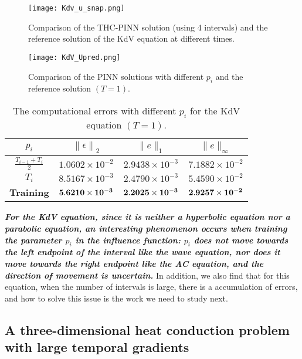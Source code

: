 \documentclass[preprint]{elsarticle}
\numberwithin{table}{section}
\numberwithin{equation}{section}
\numberwithin{figure}{section}
\begin{document}
\begin{CJK}{UTF8}{gbsn}
\begin{figure}[htbp]
\centering
\texttt{[image: Kdv\_u\_snap.png]}
\caption{
Comparison of the THC-PINN solution (using 4 intervals) and the reference solution of the
KdV equation at different times.}
\label{KdV_c2}
\end{figure}

\begin{figure}[htbp]
\centering
\texttt{[image: KdV\_Upred.png]}
\caption{
Comparison of the PINN solutions  with different $p_i$ and the reference solution $(T=1)$.}
\label{KdV_c1}
\end{figure}

\begin{table}[htbp]
    \centering
    \begin{tabular}{c|ccc}
        \hline
      $p_i$ &  $\left\|\epsilon\right\|_{2}$  & $\|e\|_1 $ & $\|e\|_\infty$ \\ 
    
\hline
 $ \frac{T_{i-1}+T_{i}}{2}$  & $1.0602 \times 10^{-2}$ & $2.9438 \times 10^{-3}$ & $7.1882 \times 10^{-2}$ \\
$T_{i}$& $8.5167 \times 10^{-3}$ & $2.4790 \times 10^{-3}$ & $5.4590 \times 10^{-2}$ \\
 {\textbf{Training}} &  {$\bf{5.6210 \times 10^{-3}}$} &  {$\bf{2.2025 \times 10^{-3}}$} &  {$\bf{2.9257 \times 10^{-2}}$} \\
        \hline
    \end{tabular}
    \caption{
    The computational errors with different  $p_i$ for the KdV equation 
 {$(T=1)$}.  } 
    \label{Table_KdV-PI}
\end{table}


 
\textbf{\textit{For the KdV equation, since it is neither a hyperbolic equation nor a parabolic equation, an interesting phenomenon occurs when training the parameter $p_i$ in the influence function: $p_i$ does not move towards the left endpoint of the interval like  the wave equation, nor does it move towards the right endpoint like  the AC equation, and the direction of movement is uncertain.}} In addition, 
  we also find that for this equation, when the number of intervals is large, there is a  accumulation of errors, and how to solve this issue is the work we need to study next. 
 

\subsection{A three-dimensional heat conduction problem with large temporal gradients}


\end{CJK}
\end{document}
